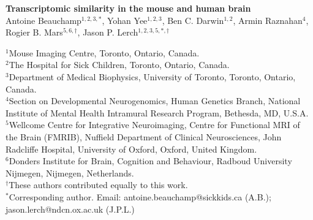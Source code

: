 
\LARGE{\textbf{Transcriptomic similarity in the mouse and human brain}}\\

\large
Antoine Beauchamp$^{1,2,3,*}$, Yohan Yee$^{1,2,3}$, Ben C. Darwin$^{1,2}$, Armin Raznahan$^{4}$, Rogier B. Mars$^{5,6,\dagger}$, Jason P. Lerch$^{1,2,3,5,*,\dagger}$\\

\onehalfspacing

\small
$^1$Mouse Imaging Centre, Toronto, Ontario, Canada.\\
$^2$The Hospital for Sick Children, Toronto, Ontario, Canada.\\
$^3$Department of Medical Biophysics, University of Toronto, Toronto, Ontario, Canada.\\
$^4$Section on Developmental Neurogenomics, Human Genetics Branch, National Institute of Mental Health Intramural Research Program, Bethesda, MD, U.S.A.\\
$^5$Wellcome Centre for Integrative Neuroimaging, Centre for Functional MRI of the Brain (FMRIB), Nuffield Department of Clinical Neurosciences, John Radcliffe Hospital, University of Oxford, Oxford, United Kingdom.\\
$^6$Donders Institute for Brain, Cognition and Behaviour, Radboud University Nijmegen, Nijmegen, Netherlands.\\
$^{\dagger}$These authors contributed equally to this work.\\
$^{*}$Corresponding author. Email: antoine.beauchamp@sickkids.ca (A.B.); jason.lerch@ndcn.ox.ac.uk (J.P.L.)

\normalsize
{}